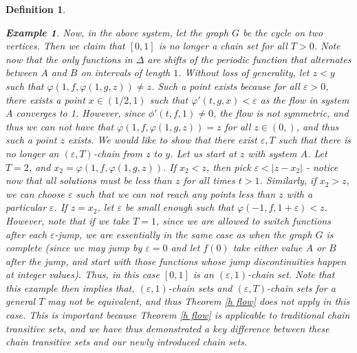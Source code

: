 \documentclass[11pt]{article}
\newtheorem{defn}[thm]{Definition}
\newtheorem{ex}[thm]{Example}
\begin{document}
\begin{defn}
\begin{ex}
\indent Now, in the above system, let the graph $G$ be the cycle on two vertices.  Then we claim that $[0,1]$ is no longer a chain set for all $T>0$.  Note now that the only functions in $\Delta$ are shifts of the periodic function that alternates between $A$ and $B$ on intervals of length $1$.  Without loss of generality, let $z<y$ such that $\varphi(1,f,\varphi(1,g,z))\not=z$.  Such a point exists because for all $\varepsilon>0$, there exists a point $x\in(1/2,1)$ such that $\varphi'(t,g,x )<\varepsilon$ as the flow in system $A$ converges to 1.  However, since $\phi'(t,f,1)\not=0$, the flow is not symmetric, and thus we can not have that $\varphi(1,f,\varphi(1,g,z))=z$ for all $z\in(0,)$, and thus such a point $z$ exists.  We would like to show that there exist $\varepsilon,T$ such that there is no longer an $(\varepsilon,T)$-chain from $z$ to $y$.  Let us start at $z$ with system $A$.  Let $T=2$, and $x_{2}=\varphi(1,f,\varphi(1,g,z))$.  If $x_{2}<z$, then pick $\varepsilon<|z-x_{2}|$ - notice now that all solutions must be less than $z$ for all times $t>1$.  Similarly, if $x_{2}>z$, we can choose $\varepsilon$ such that we can not reach any points less than $z$ with a particular $\varepsilon$. If $z=x_{2}$, let $\varepsilon$ be small enough such that $\varphi(-1,f,1+\varepsilon)<z$. \\
\indent However, note that if we take $T=1$, since we are allowed to switch functions after each $\varepsilon$-jump, we are essentially in the same case as when the graph $G$ is complete (since we may jump by $\varepsilon=0$ and let $f(0)$ take either value $A$ or $B$ after the jump, and start with those functions whose jump discontinuities happen at integer values). Thus, in this case $[0,1]$ is an $(\varepsilon,1)$-chain set.  Note that this example then implies that, $(\varepsilon,1)$-chain sets and $(\varepsilon,T)$-chain sets for a general $T$ may not be equivalent, and thus Theorem \ref{h flow} does not apply in this case.  This is important because Theorem \ref{h flow} is applicable to traditional chain transitive sets, and we have thus demonstrated a key difference between these chain transitive sets and our newly introduced chain sets.
\end{ex}


\end{defn}
\end{document}
